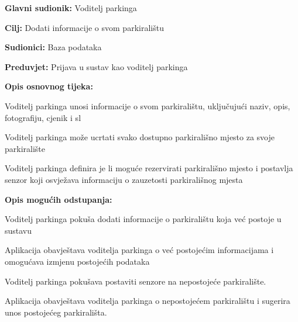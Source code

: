 \noindent {}
\begin{packed_item}
	
	\item \textbf{Glavni sudionik: }Voditelj parkinga
	\item  \textbf{Cilj:} Dodati informacije o svom parkiralištu
	\item  \textbf{Sudionici:} Baza podataka
	\item  \textbf{Preduvjet:} Prijava u sustav kao voditelj parkinga
	\item  \textbf{Opis osnovnog tijeka:}
	
	\item[] \begin{packed_enum}
		
		\item Voditelj parkinga unosi informacije o svom parkiralištu, uključujući naziv, opis, fotografiju, cjenik i sl
		\item Voditelj parkinga može ucrtati svako dostupno parkirališno mjesto za svoje parkiralište
		\item Voditelj parkinga definira je li moguće rezervirati parkirališno mjesto i postavlja senzor koji osvježava informaciju o zauzetosti parkirališnog mjesta
		
	\end{packed_enum}
	
	\item  \textbf{Opis mogućih odstupanja:}
	
	\item[] \begin{packed_item}
		
		\item[1.a] Voditelj parkinga pokuša dodati informacije o parkiralištu koja već postoje u sustavu
		\item[] \begin{packed_enum}
			
			\item Aplikacija obavještava voditelja parkinga o već postojećim informacijama i omogućava izmjenu postojećih podataka
			
		\end{packed_enum}
		\item[3.a] Voditelj parkinga pokušava postaviti senzore na nepostojeće parkiralište.
		\item[] \begin{packed_enum}
			
			\item Aplikacija obavještava voditelja parkinga o nepostojećem parkiralištu i sugerira unos postojećeg parkirališta.
			
		\end{packed_enum}
		
	\end{packed_item}
	
\end{packed_item}

